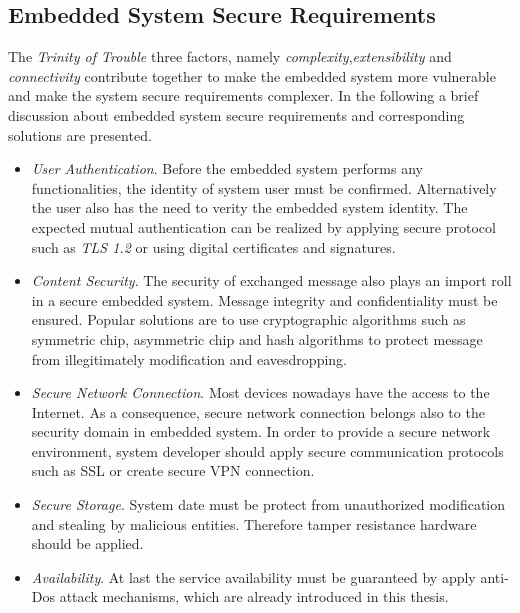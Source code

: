\subsection{Embedded System Secure Requirements}
The \emph{Trinity of Trouble}\cite{embedded_secure} three factors, namely \emph{complexity},\emph{extensibility} and \emph{connectivity} contribute together to make the embedded system more vulnerable and make the  system secure requirements complexer.
In the following a brief discussion about embedded system secure requirements and corresponding solutions are presented\cite{embedded_secure}.
\begin{itemize}
\item \emph{User Authentication}. Before the embedded system performs any functionalities, the identity of system user must be confirmed. Alternatively the user also has the need to verity the embedded system identity. The expected mutual authentication can be realized by applying secure protocol such as \emph{TLS 1.2} or using digital certificates and signatures.
\item \emph{Content Security}. The security of exchanged message also plays an import roll in a secure embedded system. Message integrity and confidentiality must be ensured. Popular solutions are to use cryptographic algorithms such as symmetric chip, asymmetric chip and hash algorithms to protect message from illegitimately modification and eavesdropping.
\item \emph{Secure Network Connection}. Most devices nowadays have the access to the Internet. As a consequence, secure  network connection belongs also to the security domain in embedded system. In order  to provide a secure network environment, system developer should apply secure communication protocols such as SSL or create secure VPN connection\cite{embedded_secure}.
\item \emph{Secure Storage}. System date must be protect from unauthorized modification and stealing by malicious entities. Therefore tamper resistance hardware should be applied.
\item \emph{Availability}. At last the service availability must be guaranteed by apply anti-Dos attack mechanisms, which are already introduced in this thesis.
\end{itemize}
